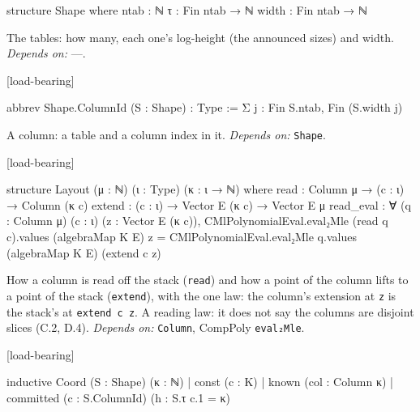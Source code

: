 \begin{leancode}
structure Shape where
  ntab : ℕ
  τ : Fin ntab → ℕ
  width : Fin ntab → ℕ
\end{leancode}


The tables: how many, each one's log-height (the announced sizes) and width. \emph{Depends on:} —.

\par\medskip\noindent\textbf{}\hfill\textsf{\small [load-bearing]}\par\nopagebreak

\begin{leancode}
abbrev Shape.ColumnId (S : Shape) : Type := Σ j : Fin S.ntab, Fin (S.width j)
\end{leancode}


A column: a table and a column index in it. \emph{Depends on:} \texttt{Shape}.

\par\medskip\noindent\textbf{}\hfill\textsf{\small [load-bearing]}\par\nopagebreak

\begin{leancode}
structure Layout (μ : ℕ) (ι : Type) (κ : ι → ℕ) where
  read : Column μ → (c : ι) → Column (κ c)
  extend : (c : ι) → Vector E (κ c) → Vector E μ
  read_eval : ∀ (q : Column μ) (c : ι) (z : Vector E (κ c)),
    CMlPolynomialEval.eval₂Mle (read q c).values (algebraMap K E) z =
      CMlPolynomialEval.eval₂Mle q.values (algebraMap K E) (extend c z)
\end{leancode}


How a column is read off the stack (\texttt{read}) and how a point of the column lifts to a point of the stack (\texttt{extend}), with the one law: the column's extension at \texttt{z} is the stack's at \texttt{extend c z}. A reading law: it does not say the columns are disjoint slices (C.2, D.4). \emph{Depends on:} \texttt{Column}, CompPoly \texttt{eval₂Mle}.

\par\medskip\noindent\textbf{}\hfill\textsf{\small [load-bearing]}\par\nopagebreak

\begin{leancode}
inductive Coord (S : Shape) (κ : ℕ)
  | const (c : K)
  | known (col : Column κ)
  | committed (c : S.ColumnId) (h : S.τ c.1 = κ)
\end{leancode}

